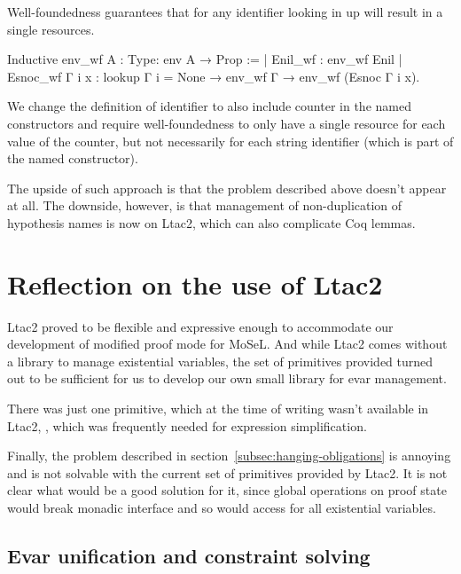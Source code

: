 Well-foundedness guarantees that for any identifier looking in up will result in a single resources.
\begin{coq}
  Inductive env_wf {A : Type}: env A → Prop :=
  | Enil_wf : env_wf Enil
  | Esnoc_wf Γ i x : lookup Γ i = None → env_wf Γ → env_wf (Esnoc Γ i x).
\end{coq}

We change the definition of identifier to also include counter in the named constructors and require well-foundedness to only have a single resource for each value of the counter, but not necessarily for each string identifier (which is part of the named constructor).

The upside of such approach is that the problem described above doesn't appear at all.
The downside, however, is that management of non-duplication of hypothesis names is now on Ltac2, which can also complicate Coq lemmas.

\section{Reflection on the use of Ltac2}

Ltac2 proved to be flexible and expressive enough to accommodate our development of modified proof mode for MoSeL.
And while Ltac2 comes without a library to manage existential variables, the set of primitives provided turned out to be sufficient for us to develop our own small library for evar management.

There was just one primitive, which at the time of writing wasn't available in Ltac2, , which was frequently needed for expression simplification.

Finally, the problem described in section~\ref{subsec:hanging-obligations} is annoying and is not solvable with the current set of primitives provided by Ltac2.
It is not clear what would be a good solution for it, since global operations on proof state would break monadic interface and so would access for all existential variables.

\subsection{Evar unification and constraint solving}
\label{subsec:evar-unification-and-constr-solving}

